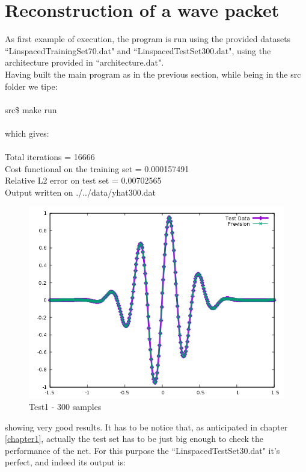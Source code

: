 \documentclass[12pt, a4paper]{report}
\theoremstyle{definition}
\begin{document}
{\section{Reconstruction of a wave packet}
As first example of execution, the program is run using the provided datasets ``LinspacedTrainingSet70.dat" and ``LinspacedTestSet300.dat", using the architecture provided in ``architecture.dat".\\
Having built the main program as in the previous section, while being in the src folder we tipe:\\
{\\ \ttfamily 
	src\$ make run\\
\\}
which gives:\\
{\\ \ttfamily 
Total iterations = 16666\\
Cost functional on the training set = 0.000157491\\
Relative L2 error on test set = 0.00702565\\
Output written on ./../data/yhat300.dat\\
}
\begin{figure}[H]
	\centering
	\includegraphics[width=\textwidth]{img/Prevision300} 
	\caption{Test1 - 300 samples}
\end{figure}
showing very good results. It has to be notice that, as anticipated in chapter \ref{chapter1}, actually the test set has to be just big enough to check the performance of the net. For this purpose the ``LinspacedTestSet30.dat" it's perfect, and indeed its output is:\\
}
\end{document}
